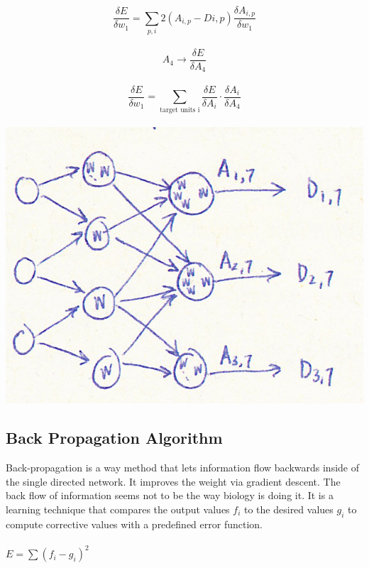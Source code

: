 \documentclass[english,11pt]{article}
\begin{document}
\begin{center}
\begin{equation}
\frac{\delta E}{\delta w_1} = \sum_{p,i} 2(A_{i,p}-D{i,p}) \frac{\delta A_{i,p}}{\delta w_1}
\end{equation}\\
\begin{equation}
A_4 \rightarrow \frac{\delta E}{\delta A_4}
\end{equation}\\
\begin{equation}
\frac{\delta E}{\delta w_1} = \sum_{\text{target units i}} \frac{\delta E}{\delta A_i} \cdot \frac{\delta A_{i}}{\delta A_4}
\end{equation}\\
\includegraphics[]{fnn_network.png}\\
\end{center}

\subsection{Back Propagation Algorithm}

Back-propagation is a way method that lets information flow backwards inside of the single directed network. It improves the weight via gradient descent. The back flow of information seems not to be the way biology is doing it. It is a learning technique that compares the output values $f_i$ to the desired values $g_i$ to compute corrective values with a predefined error function.\\\\
$E = \sum (f_i -g_i)^2$\\
\end{document}
